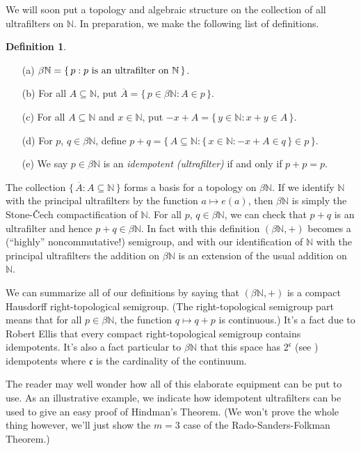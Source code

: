 \documentclass[12pt]{article}
\theoremstyle{plain}
\theoremstyle{definition}
\newtheorem{defn}[thm]{Definition}
\newcommand{\bbN}{\mathbb{N}}
\begin{document}
We will soon put a topology and algebraic structure on the collection
of all ultrafilters on $\bbN$. 
In preparation, we make the following list of definitions.

  \begin{defn}
    \label{defn:alg}
    \begin{itemize}
      \item[(a)] $\beta\bbN = \{\, p : \hbox{$p$ is an ultrafilter on
          $\bbN$} \,\}$.
      \item[(b)] For all $A \subseteq \bbN$, put $\overline{A} = \{\,
        p \in \beta\bbN : A \in p \,\}$.
      \item[(c)] For all $A \subseteq \bbN$ and $x \in \bbN$, put
        $-x+A = \{\, y \in \bbN : x+y \in A \,\}$.
      \item[(d)] For $p$, $q \in \beta\bbN$, define
        $p+q = \bigl\{\, A \subseteq \bbN : \{\, x \in \bbN : -x +A \in q
        \,\} \in p \,\bigr\}$.
      \item[(e)] We say $p \in \beta\bbN$ is an \textsl{idempotent
          (ultrafilter)} if  and only if $p + p = p$.
    \end{itemize}
  \end{defn}

The collection $\{\, \overline{A} : A \subseteq \bbN \,\}$ forms a
basis for a topology on $\beta\bbN$.
If we identify $\bbN$ with the principal ultrafilters by the function
$a \mapsto e(a)$, then $\beta\bbN$ is simply the Stone-\v{C}ech
compactification of $\bbN$. 
For all $p$, $q \in \beta\bbN$, we can check that $p+q$ is an
ultrafilter and hence $p+q \in \beta\bbN$.
In fact with this definition $(\beta\bbN, +)$ becomes a (``highly''
noncommutative!) semigroup, and with our identification of $\bbN$ with
the principal ultrafilters the addition on $\beta\bbN$ is an extension
of the usual addition on $\bbN$. 

We can summarize all of our definitions by saying that $(\beta\bbN,
+)$ is a compact Hausdorff right-topological semigroup. 
(The right-topological semigroup part means that for all $p \in
\beta\bbN$, the function $q \mapsto q+p$ is continuous.)
It's a fact due to Robert Ellis that every compact right-topological
semigroup contains idempotents. 
It's also a fact particular to $\beta\bbN$ that this space has
$2^\mathfrak{c}$ (see \cite[Theorem 6.44]{Hindman:1998fk}) idempotents
where $\mathfrak{c}$ is the cardinality of the continuum. 

The reader may well wonder how all of this elaborate equipment can be
put to use. 
As an illustrative example, we indicate how idempotent ultrafilters
can be used to give an easy proof of Hindman's Theorem. 
(We won't prove the whole thing however, we'll just show the $m=3$
case of the Rado-Sanders-Folkman Theorem.)
\end{document}
